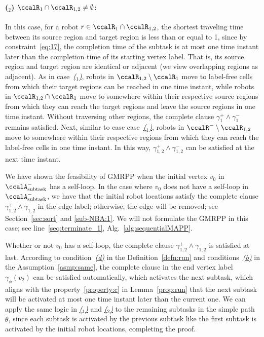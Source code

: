 \documentclass[Afour,sageh,times]{sagej}
\newcounter{mycounter}
\newcommand{\auto}[1]{\ccalA_{\textup{#1}}}
\begin{document}
{\paragraph{($_2$) $\ccalR_1 \cap \ccalR_{1,2} \neq \emptyset$:} In this case, for a robot $r \in  \ccalR_1 \cap \ccalR_{1,2}$, the shortest traveling time between its source region and target region is less than or equal to 1, since by constraint~\eqref{eq:17}, the completion time of the subtask is at most one time instant later than the completion time of its starting vertex label. That is, its source  region and target region are identical or adjacent (we view overlapping regions as adjacent). As in case~\hyperref[app:gmrpp_a]{\it ($_1$)}, robots in $\ccalR_{1,2} \setminus \ccalR_1$ move to label-free cells from which their target regions can be reached in one time instant, while robots in $\ccalR_{1,2} \cap \ccalR_1$ move to somewhere within their respective source regions from which they can reach the target regions and leave the source regions in one time instant. Without traversing other regions, the complete clause $\gamma_1^+ \wedge \gamma_1^-$ remains satisfied. Next, similar to case case~\hyperref [app:gmrpp_a]{\it ($_1$)}, robots in $\ccalR^-\setminus \ccalR_{1,2}$ move to somewhere within their respective regions from which they can reach the label-free cells in one time instant. In this way, $\gamma_{1,2}^+ \wedge \gamma_{1,2}^-$ can be satisfied at the next time instant.

We have shown the feasibility of GMRPP when the initial vertex $v_0$ in $\auto{subtask}^-$ has a self-loop. In the case where $v_0$ does not have a self-loop in $\auto{subtask}^-$, we have that the initial robot locations satisfy the complete clause  $\gamma_{1,2}^+ \wedge \gamma_{1,2}^-$ in the  edge label; otherwise, the edge will be  removed; see Section~\ref{sec:sort} and \ref{sub-NBA:1}. We will not formulate the GMRPP in this case; see line~\ref{seq:terminate_1}, Alg.~\ref{alg:sequentialMAPP}.


Whether or not $v_0$ has a self-loop, the complete clause $\gamma_{1,2}^+ \wedge \gamma_{1,2}^-$ is satisfied at last. According to condition~\hyperref[cond:d]{\it (d)} in the Definition~\ref{defn:run} and conditions~\hyperref[asmp:b]{\it (b)} in the Assumption~\ref{asmp:same}, the complete clause in the end vertex label $\gamma_\phi(v_2)$ can be satisfied automatically, which activates the next subtask, which aligns with the property~\ref{property:c} in Lemma~\ref{prop:run} that  the next subtask will be activated at most one time instant later than the current one.  We can apply the same logic in \hyperref [app:gmrpp_a]{\it ($_1$)} and \hyperref [app:gmrpp_a]{\it ($_2$)} to the remaining subtasks in the simple path $\tilde{\theta}$, since each subtask is activated by the previous subtask like the first subtask is activated by the initial robot locations, completing the proof.

}
\end{document}
